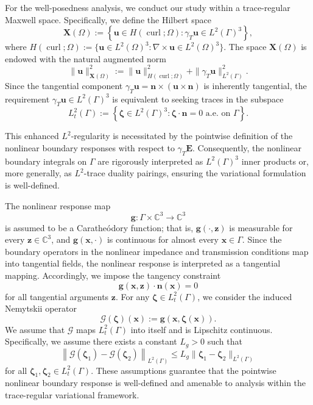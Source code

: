 \documentclass[12pt,reqno]{amsart}
\theoremstyle{definition}
\numberwithin{equation}{section}
\begin{document}
For the well-posedness analysis, we conduct our study within a trace-regular Maxwell space. Specifically, we define the Hilbert space
\[
\mathbf{X}(\Omega) := \left\{ \mathbf{u} \in H(\operatorname{curl}; \Omega) : \gamma_T \mathbf{u} \in L^2(\Gamma)^3 \right\},
\]
where $H(\operatorname{curl}; \Omega) := \{ \mathbf{u} \in L^2(\Omega)^3 : \nabla \times \mathbf{u} \in L^2(\Omega)^3 \}$. The space $\mathbf{X}(\Omega)$ is endowed with the natural augmented norm
\[
\|\mathbf{u}\|_{\mathbf{X}(\Omega)}^2 := \|\mathbf{u}\|_{H(\operatorname{curl}; \Omega)}^2 + \|\gamma_T \mathbf{u}\|_{L^2(\Gamma)}^2.
\]
Since the tangential component $\gamma_T \mathbf{u} = \mathbf{n} \times (\mathbf{u} \times \mathbf{n})$ is inherently tangential, the requirement $\gamma_T \mathbf{u} \in L^2(\Gamma)^3$ is equivalent to seeking traces in the subspace 
\[
L_t^2(\Gamma) := \left\{ \boldsymbol{\zeta} \in L^2(\Gamma)^3 : \boldsymbol{\zeta} \cdot \mathbf{n} = 0 \text{ a.e. on } \Gamma \right\}.
\]

This enhanced $L^2$-regularity is necessitated by the pointwise definition of the nonlinear boundary responses with respect to $\gamma_T \mathbf{E}$. Consequently, the nonlinear boundary integrals on $\Gamma$ are rigorously interpreted as $L^2(\Gamma)^3$ inner products or, more generally, as $L^2$-trace duality pairings, ensuring the variational formulation is well-defined.


The nonlinear response map
\[
\mathbf{g} \colon \Gamma \times \mathbb{C}^3 \to \mathbb{C}^3
\]
is assumed to be a Carathe\'odory function; that is, $\mathbf{g}(\cdot, \boldsymbol{z})$ is measurable for every $\boldsymbol{z} \in \mathbb{C}^3$, and $\mathbf{g}(\boldsymbol{x}, \cdot)$ is continuous for almost every $\boldsymbol{x} \in \Gamma$. Since the boundary operators in the nonlinear impedance and transmission conditions map into tangential fields, the nonlinear response is interpreted as a tangential mapping. Accordingly, we impose the tangency constraint
\[
\mathbf{g}(\boldsymbol{x}, \boldsymbol{z}) \cdot \mathbf{n}(\boldsymbol{x}) = 0
\]
for all tangential arguments $\boldsymbol{z}$. For any $\boldsymbol{\zeta} \in L_t^2(\Gamma)$, we consider the induced Nemytskii operator
\[
\mathcal{G}(\boldsymbol{\zeta})(\boldsymbol{x}) := \mathbf{g}(\boldsymbol{x}, \boldsymbol{\zeta}(\boldsymbol{x})).
\]
We assume that $\mathcal{G}$ maps $L_t^2(\Gamma)$ into itself and is Lipschitz continuous. Specifically, we assume there exists a constant $L_g > 0$ such that
\begin{equation}
\label{eq:g_lipschitz_L2}
\left\| \mathcal{G}(\boldsymbol{\zeta}_1) - \mathcal{G}(\boldsymbol{\zeta}_2) \right\|_{L^2(\Gamma)} \le L_g \|\boldsymbol{\zeta}_1 - \boldsymbol{\zeta}_2\|_{L^2(\Gamma)}
\end{equation}
for all $\boldsymbol{\zeta}_1, \boldsymbol{\zeta}_2 \in L_t^2(\Gamma)$. These assumptions guarantee that the pointwise nonlinear boundary response is well-defined and amenable to analysis within the trace-regular variational framework.
\end{document}
